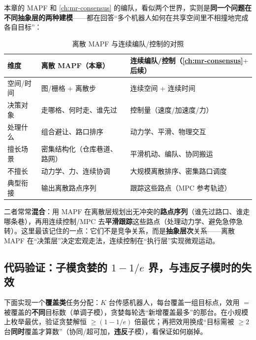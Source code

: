 本章的 MAPF 和 \cref{ch:mr-consensus} 的编队，看似两个世界，实则是\textbf{同一个问题在不同抽象层的两种建模}——都在回答“多个机器人如何在共享空间里不相撞地完成各自目标”：

\begin{table}[H]\centering\small
\caption{离散 MAPF 与连续编队/控制的对照}
\label{tab:mapf-vs-formation}
\begin{tabular}{lll}
\toprule
维度 & 离散 MAPF（本章） & 连续编队/控制（\cref{ch:mr-consensus}$+$后续） \\
\midrule
空间/时间 & 图/栅格 $+$ 离散步 & 连续空间 $+$ 连续时间 \\
决策对象 & 走哪格、何时走、谁先过 & 控制量（速度/加速度/力） \\
处理什么 & 组合避让、路口排序 & 动力学、平滑、物理交互 \\
擅长场景 & 密集结构化（仓库巷道、路网） & 平滑机动、编队、协同搬运 \\
不擅长 & 动力学、力、连续协调 & 大规模离散排序、密集路口调度 \\
典型衔接 & 输出离散路点序列 & 跟踪这些路点（MPC 参考轨迹） \\
\bottomrule
\end{tabular}
\end{table}

二者常常\textbf{混合}：用 MAPF 在离散层规划出无冲突的\textbf{路点序列}（谁先过路口、谁走哪条巷），再用连续控制/MPC 去\textbf{平滑跟踪}这些路点（处理动力学、避免急停急转）。这里最该记住的一点：它们不是竞争关系，而是\textbf{抽象层次}关系——离散 MAPF 在“决策层”决定宏观走法，连续控制在“执行层”实现微观运动。

\subsection{代码验证：子模贪婪的 \texorpdfstring{$1-1/e$}{1-1/e} 界，与违反子模时的失效}
\label{sec:mapf-submod-code}

下面实现一个\textbf{覆盖类}任务分配：$K$ 台传感机器人，每台覆盖一组目标点，效用 $=$ 被覆盖的\textbf{不同}目标数（单调子模），贪婪每轮选“新增覆盖最多”的那台。在小规模上枚举最优，验证贪婪解恒 $\ge (1-1/e)$ 倍最优；再把效用换成“目标需被 $\ge 2$ 台\textbf{同时}覆盖才算数”（协同/超可加，\textbf{违反}子模），看保证如何崩掉。

